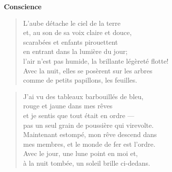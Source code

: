
\vspace*{-15mm}
\centeredornament
\vspace*{2mm}


\begin{center}
  \textbf{\large Conscience}
\end{center}




\begin{verse}
  L'aube détache le ciel de la terre \\
  et, au son de sa voix claire et douce, \\
  scarabées et enfants pirouettent \\
  en entrant dans la lumière du jour; \\
  l'air n'est pas humide, la brillante légèreté flotte!\hspace*{-4mm} \\
  Avec la nuit, elles se posèrent sur les arbres \\
  comme de petits papillons, les feuilles.
\end{verse}

\bigskip




\begin{verse}
  J'ai vu des tableaux barbouillés de bleu, \\
  rouge et jaune dans mes rêves \\
  et je sentis que tout était en ordre --- \\
  pas un seul grain de poussière qui virevolte. \\
  Maintenant estompé, mon rêve descend dans \\
  mes membres, et le monde de fer est l'ordre. \\
  Avec le jour, une lune point en moi et, \\
  à la nuit tombée, un soleil brille ci-dedans.
\end{verse}

